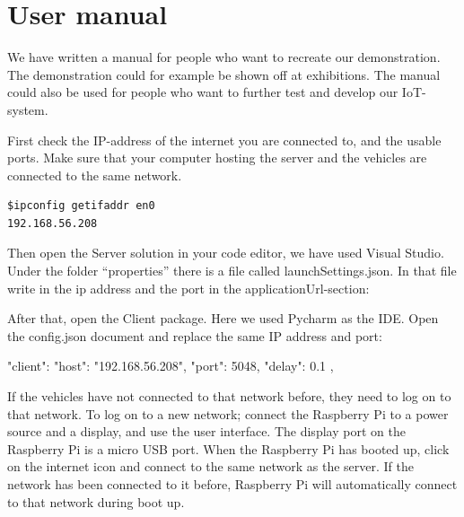 \chapter{User manual}\label{sec:user_manual}
We have written a manual for people who want to recreate our demonstration. The demonstration could for example be shown off at exhibitions. The manual could also be used for people who want to further test and develop our IoT-system.

First check the IP-address of the internet you are connected to, and the usable ports. Make sure that your computer hosting the server and the vehicles are connected to the same network.

\begin{lstlisting}
$ipconfig getifaddr en0
192.168.56.208
\end{lstlisting}

Then open the Server solution in your code editor, we have used Visual Studio. Under the folder “properties” there is a file called launchSettings.json. In that file write in the ip address and the port in the applicationUrl-section:

\begin{json}
"profiles": {
	"SignalRServer": {
		"commandName": "Project",
		"dotnetRunMessages": true,
		"launchBrowser": false,
		"applicationUrl": "https://192.168.56.208:7058;http://192.168.56.208:5048",
		"environmentVariables": {
			"ASPNETCORE_ENVIRONMENT": "Development"
		}
	},
\end{json}
	
After that, open the Client package. Here we used Pycharm as the IDE. Open the config.json document and replace the same IP address and port:
	
\begin{json}
"client": {
	"host": "192.168.56.208",
	"port": 5048,
	"delay": 0.1
},
\end{json}
	
	If the vehicles have not connected to that network before, they need to log on to that network. To log on to a new network; connect the Raspberry Pi to a power source and a display, and use the user interface. The display port on the Raspberry Pi is a micro USB port. When the Raspberry Pi has booted up, click on the internet icon and connect to the same network as the server. If the network has been connected to it before, Raspberry Pi will automatically connect to that network during boot up.
	
